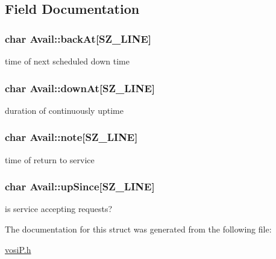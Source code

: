 \subsection{Field Documentation}
\hypertarget{structAvail_8baad63d1401b54bc8fcf4e4a880746a}{
\subsubsection[{backAt}]{\setlength{\rightskip}{0pt plus 5cm}char {\bf Avail::backAt}\mbox{[}SZ\_\-LINE\mbox{]}}}
\label{structAvail_8baad63d1401b54bc8fcf4e4a880746a}


time of next scheduled down time \hypertarget{structAvail_f997dc41238dc4355927949c44c931ef}{
\subsubsection[{downAt}]{\setlength{\rightskip}{0pt plus 5cm}char {\bf Avail::downAt}\mbox{[}SZ\_\-LINE\mbox{]}}}
\label{structAvail_f997dc41238dc4355927949c44c931ef}


duration of continuously uptime \hypertarget{structAvail_c365e387923dbc6eaae135e942a8edb2}{
\subsubsection[{note}]{\setlength{\rightskip}{0pt plus 5cm}char {\bf Avail::note}\mbox{[}SZ\_\-LINE\mbox{]}}}
\label{structAvail_c365e387923dbc6eaae135e942a8edb2}


time of return to service \hypertarget{structAvail_190f6558dc397d810a41f6c3f23b0fe6}{
\subsubsection[{upSince}]{\setlength{\rightskip}{0pt plus 5cm}char {\bf Avail::upSince}\mbox{[}SZ\_\-LINE\mbox{]}}}
\label{structAvail_190f6558dc397d810a41f6c3f23b0fe6}


is service accepting requests? 

The documentation for this struct was generated from the following file:\begin{CompactItemize}
\item 
\hyperlink{vosiP_8h}{vosiP.h}\end{CompactItemize}

